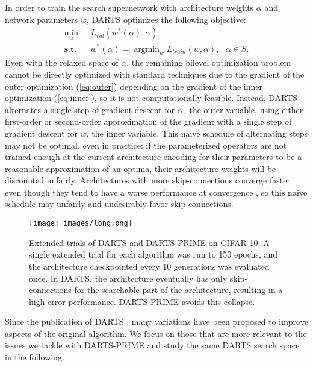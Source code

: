 \documentclass[letterpaper]{article} \usepackage{aaai22}  \usepackage{times}  \usepackage{helvet}  \usepackage{courier}  \usepackage[hyphens]{url}  \usepackage{graphicx} \urlstyle{rm} \def\UrlFont{\rm}  \usepackage{natbib}  \usepackage{caption} \DeclareCaptionStyle{ruled}{labelfont=normalfont,labelsep=colon,strut=off} \frenchspacing  \setlength{\pdfpagewidth}{8.5in}  \setlength{\pdfpageheight}{11in}  \usepackage{algorithm}
\DeclareMathOperator*{\argmin}{argmin}
\begin{document}
In order to train the search supernetwork with architecture weights $\alpha$ and network parameters $w$, DARTS optimizes the following objective:
\begin{subequations}
\label{eq:bilevel}
 \begin{align}
 \min_\alpha \text{ } &L_{val}(w^*(\alpha),\alpha)    \label{eq:outer} \\
  \textbf{s.t. } &w^*(\alpha) = \argmin_w L_{train}(w,\alpha), \text{ }\alpha \in S. \label{eq:inner}
 \end{align}
\end{subequations}
Even with the relaxed space of $\alpha$, the remaining bilevel optimization problem cannot be directly optimized with standard techniques due to the gradient of the outer optimization (\ref{eq:outer}) depending on the gradient of the inner optimization (\ref{eq:inner}), so it is not computationally feasible. Instead, DARTS alternates a single step of gradient descent for $\alpha,$ the outer variable, using either first-order or second-order approximation of the gradient with a single step of gradient descent for $w$, the inner variable. This naive schedule of alternating steps may not be optimal, even in practice: if the parameterized operators are not trained enough at the current architecture encoding for their parameters to be a reasonable approximation of an optima, their architecture weights will be discounted unfairly. Architectures with more skip-connections converge faster even though they tend to have a worse performance at convergence \cite{zhou2020theory}, so this naive schedule may unfairly and undesirably favor skip-connections.  



\begin{figure}[tb!]
\texttt{[image: images/long.png]}
\caption{Extended trials of DARTS and DARTS-PRIME on CIFAR-10. A single extended trial for each algorithm was run to 150 epochs, and the architecture checkpointed every 10 generations was evaluated once. In DARTS, the architecture eventually has only skip-connections for the searchable part of the architecture, resulting in a high-error performance. DARTS-PRIME avoids this collapse.} \label{fig:long}
\end{figure}

Since the publication of DARTS \cite{liu2018darts}, many variations have been proposed to improve aspects of the original algorithm. We focus on those that are more relevant to the issues we tackle with DARTS-PRIME and study the same DARTS search space in the following.
\end{document}
